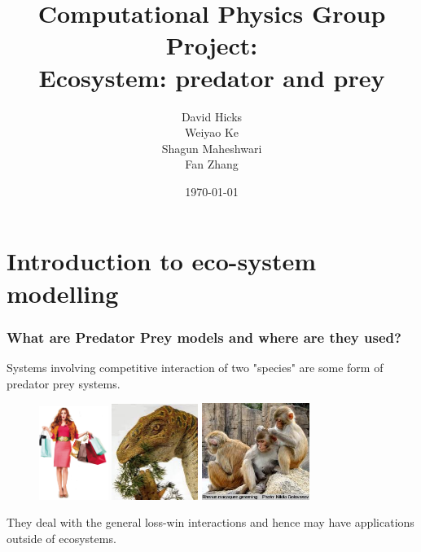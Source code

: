 \documentclass{beamer}
\title{Computational Physics Group Project: \\ Ecosystem: predator and prey}
\author{David Hicks\\ Weiyao Ke \\ Shagun Maheshwari \\ Fan Zhang}
\date{\today}
\begin{document}
\frame{\titlepage}

\section[Outline]{}
\frame{\tableofcontents}

\section{Introduction to eco-system modelling}
\frame
{
	\frametitle{What are Predator Prey models and where are they used?}
	
Systems involving competitive interaction of two "species" are some form of predator prey systems. \\
\begin{figure}[H]
  	\centering
      
	\includegraphics[width = 0.2\textwidth]{./pics/resource_consumer.jpeg} 
        \includegraphics[width = 0.25\textwidth]{./pics/Plant_herbivore.jpeg} 
        \includegraphics[width = 0.31\textwidth]{./pics/Parasite_host.jpeg} 
       
        \label{Intro}
  \end{figure}

They deal with the general loss-win interactions and hence may have applications outside of ecosystems. 
}
\end{document}
